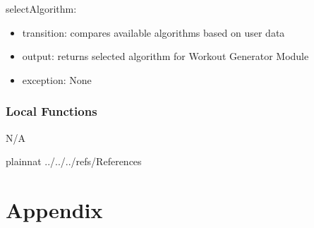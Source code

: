 \documentclass[12pt, titlepage]{article}
\begin{document}
\noindent selectAlgorithm:
\begin{itemize}
\item transition: compares available algorithms based on user data
\item output: returns selected algorithm for Workout Generator Module
\item exception: None
\end{itemize}


\subsubsection{Local Functions}
N/A

\newpage

 {plainnat}
 {../../../refs/References}

\newpage

\section{Appendix} \label{Appendix}

\end{document}
